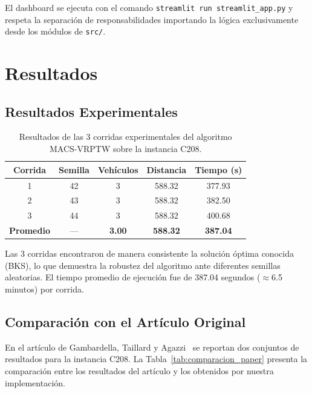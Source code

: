 \documentclass[12pt, letterpaper]{article}
\begin{document}
El dashboard se ejecuta con el comando \texttt{streamlit run streamlit\_app.py} y respeta la separación de responsabilidades importando la lógica exclusivamente desde los módulos de \texttt{src/}.

\newpage
\section{Resultados}
\label{sec:resultados}

\subsection{Resultados Experimentales}
\label{subsec:resultados_experimentales}

\begin{table}[H]
  \centering
  \caption{Resultados de las 3 corridas experimentales del algoritmo MACS-VRPTW sobre la instancia C208.}
  \label{tab:resultados_corridas}
  \begin{tabular}{ccccc}
    \toprule
    \textbf{Corrida} & \textbf{Semilla} & \textbf{Vehículos} & \textbf{Distancia} & \textbf{Tiempo (s)} \\
    \midrule
    1 & 42 & 3 & 588.32 & 377.93 \\
    2 & 43 & 3 & 588.32 & 382.50 \\
    3 & 44 & 3 & 588.32 & 400.68 \\
    \midrule
    \textbf{Promedio} & --- & \textbf{3.00} & \textbf{588.32} & \textbf{387.04} \\
    \bottomrule
  \end{tabular}
\end{table}

Las 3 corridas encontraron de manera consistente la solución óptima conocida (BKS), lo que demuestra la robustez del algoritmo ante diferentes semillas aleatorias. El tiempo promedio de ejecución fue de 387.04 segundos ($\approx$6.5 minutos) por corrida.

\subsection{Comparación con el Artículo Original}
\label{subsec:comparacion_paper}

En el artículo de Gambardella, Taillard y Agazzi~\cite{gambardella1999} se reportan dos conjuntos de resultados para la instancia C208. La Tabla~\ref{tab:comparacion_paper} presenta la comparación entre los resultados del artículo y los obtenidos por nuestra implementación.
\end{document}
